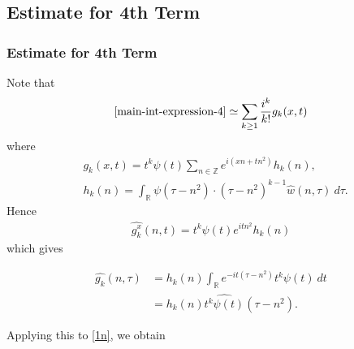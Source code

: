 \documentclass[handout]{beamer}
\numberwithin{equation}{section}
\newcommand{\rr}{\mathbb{R}}
\newcommand{\zz}{\mathbb{Z}}
\newcommand{\wh}{\widehat}
\begin{document}
\subsection{Estimate for 4th Term}
\begin{frame}
	\frametitle{Estimate for 4th Term}
Note that
%
%
\begin{equation}
	\label{1n}
	\begin{split}
		\eqref{main-int-expression-4} \simeq \sum_{k \ge 1}
		\frac{i^k}{k!}g_k(x,t)
	\end{split}
\end{equation}
%
%
where 
%
%
\begin{equation*}
	\begin{split}
		& g_k(x,t) = t^k \psi(t) \sum_{n \in \zz} e^{i\left( xn + tn^{2}
		\right)} h_k(n),
		\\
		& h_k(n) = \int_\rr \psi \left( \tau - n^{2 } \right) \cdot \left(
		\tau - n^{2 } \right)^{k -1} \wh{w}(n, \tau) \ d \tau.
	\end{split}
\end{equation*}
%
%
Hence
%
%
\begin{equation*}
	\begin{split}
		\wh{g_k^x}(n, t) = t^{k} \psi(t) e^{i t n^{2 }} h_k(n)
	\end{split}
\end{equation*}
%
%
which gives

\end{frame}
%
%
\begin{frame}

\begin{equation*}
	\begin{split}
		\wh{g_k}(n, \tau)
		& = h_k(n) \int_\rr e^{-it\left( \tau - n^{2 } \right)}
		t^{k}\psi(t) \ dt
		\\
		& = h_k(n) \wh{t^{k}\psi(t)} \left( \tau - n^{2 } \right).
	\end{split}
\end{equation*}

Applying this to \eqref{1n}, we obtain
\end{frame}
%
%
\end{document}
